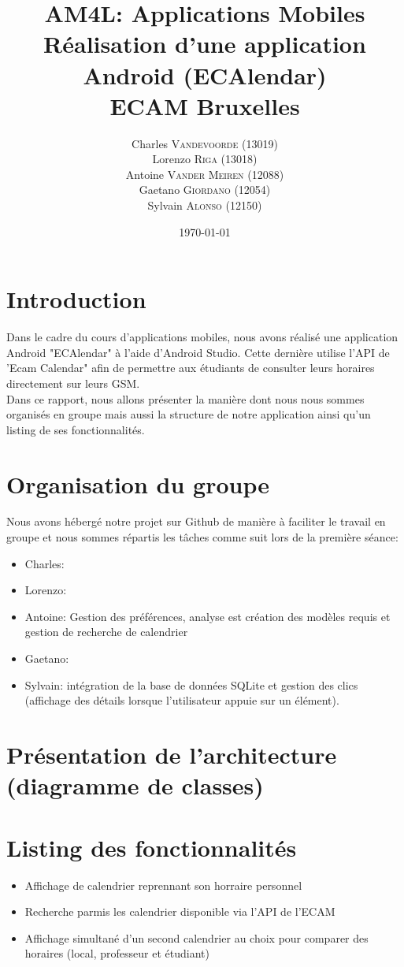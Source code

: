 \documentclass{article}
\title{AM4L: Applications Mobiles \\ Réalisation d'une application Android (ECAlendar) \\ ECAM Bruxelles} %
\author{Charles \textsc{Vandevoorde} (13019)\\
		Lorenzo \textsc{Riga} (13018)\\
		Antoine \textsc{Vander Meiren} (12088)\\
		Gaetano \textsc{Giordano} (12054)\\
		Sylvain \textsc{Alonso} (12150)\\} %
\date{\today} %
\begin{document}
	\maketitle %


	\section*{Introduction}
	\hspace{0.45cm}
	Dans le cadre du cours d'applications mobiles, nous avons réalisé une application Android "ECAlendar" à l'aide d'Android Studio. Cette dernière utilise l'API de 'Ecam Calendar" afin de permettre aux étudiants de consulter leurs horaires directement sur leurs GSM.\\

	Dans ce rapport, nous allons présenter la manière dont nous nous sommes organisés en groupe mais aussi la structure de notre application ainsi qu'un listing de ses fonctionnalités.

	\section{Organisation du groupe}
	\hspace{0.45cm}
	 Nous avons hébergé notre projet sur Github de manière à faciliter le travail en groupe et nous sommes répartis les tâches comme suit lors de la première séance:
	 \begin{itemize}
	 	\item Charles:
	 	\item Lorenzo:
	 	\item Antoine: Gestion des préférences, analyse est création des modèles requis et gestion de recherche de calendrier
	 	\item Gaetano:
	 	\item Sylvain: intégration de la base de données SQLite et gestion des clics (affichage des détails lorsque l'utilisateur appuie sur un élément).
	 \end{itemize}

	\section{Présentation de l'architecture (diagramme de classes)}
	\hspace{0.45cm}

	\section{Listing des fonctionnalités}
	\hspace{0.45cm}
		\begin{itemize}
			\item Affichage de calendrier reprennant son horraire personnel
			\item Recherche parmis les calendrier disponible via l'API de l'ECAM
			\item Affichage simultané d'un second calendrier au choix pour comparer des horaires (local, professeur et étudiant)
		\end{itemize}
\end{document}

